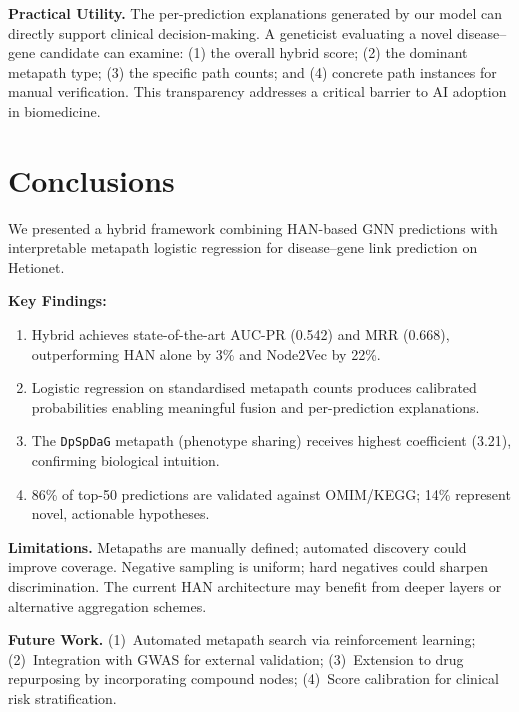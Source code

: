 \documentclass{article}
\begin{document}
\textbf{Practical Utility.} The per-prediction explanations generated by our model can directly support clinical decision-making. A geneticist evaluating a novel disease--gene candidate can examine: (1) the overall hybrid score; (2) the dominant metapath type; (3) the specific path counts; and (4) concrete path instances for manual verification. This transparency addresses a critical barrier to AI adoption in biomedicine.

\section{Conclusions}
\label{sec:conclusions}

We presented a hybrid framework combining HAN-based GNN predictions with interpretable metapath logistic regression for disease--gene link prediction on Hetionet.

\textbf{Key Findings:}
\begin{enumerate}
\item Hybrid achieves state-of-the-art AUC-PR (0.542) and MRR (0.668), outperforming HAN alone by 3\% and Node2Vec by 22\%.
\item Logistic regression on standardised metapath counts produces calibrated probabilities enabling meaningful fusion and per-prediction explanations.
\item The \texttt{DpSpDaG} metapath (phenotype sharing) receives highest coefficient (3.21), confirming biological intuition.
\item 86\% of top-50 predictions are validated against OMIM/KEGG; 14\% represent novel, actionable hypotheses.
\end{enumerate}

\textbf{Limitations.} Metapaths are manually defined; automated discovery could improve coverage. Negative sampling is uniform; hard negatives could sharpen discrimination. The current HAN architecture may benefit from deeper layers or alternative aggregation schemes.

\textbf{Future Work.} (1)~Automated metapath search via reinforcement learning; (2)~Integration with GWAS for external validation; (3)~Extension to drug repurposing by incorporating compound nodes; (4)~Score calibration for clinical risk stratification.



\end{document}
